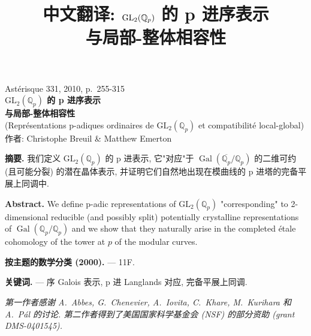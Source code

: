 \documentclass[11pt,a4paper,twoside]{ctexart}
\title{\bfseries 中文翻译: $\GL_2(\Qp)$ 的 p 进序表示\\ 与局部-整体相容性}
\author{}
\date{}
\theoremstyle{definition}
\theoremstyle{remark}
\newcommand{\Qp}{\mathbb{Q}_p}
\newcommand{\Gal}{\operatorname{Gal}}
\newcommand{\GL}{\mathrm{GL}}
\begin{document}
\begin{titlepage}
\thispagestyle{empty}
\begin{center}
{\small Ast\'erisque 331, 2010, p.\ 255-315}\\[1.5em]
{\LARGE\bfseries $\GL_2(\Qp)$ 的 p 进序表示\\[0.4em] 与局部-整体相容性}\\[0.8em]
{\normalsize (Repr\'esentations p-adiques ordinaires de $\GL_2(\Qp)$ et compatibilit\'e local-global)}\\[1.2em]
{\large 作者: Christophe Breuil \& Matthew Emerton}
\end{center}

\vspace{1.2em}

\noindent\textbf{摘要.} \quad 我们定义 $\GL_2(\Qp)$ 的 p 进表示, 它"对应"于 $\Gal(\overline{\Qp}/\Qp)$ 的二维可约 (且可能分裂) 的潜在晶体表示, 并证明它们自然地出现在模曲线的 p 进塔的完备平展上同调中.

\vspace{0.8em}

\noindent\textbf{Abstract.} \quad We define p-adic representations of $\GL_2(\Qp)$ "corresponding" to 2-dimensional reducible (and possibly split) potentially crystalline representations of $\Gal(\Qp/\Qp)$ and we show that they naturally arise in the completed \'etale cohomology of the tower at $p$ of the modular curves.

\vspace{0.8em}

\noindent\textbf{按主题的数学分类 (2000).} --- 11F.

\noindent\textbf{关键词.} --- 序 Galois 表示, p 进 Langlands 对应, 完备平展上同调.

\vspace{0.8em}

\noindent\textit{第一作者感谢 A.\ Abbes, G.\ Chenevier, A.\ Iovita, C.\ Khare, M.\ Kurihara 和 A.\ P\'al 的讨论. 第二作者得到了美国国家科学基金会 (NSF) 的部分资助 (grant DMS-0401545).}
\end{titlepage}

\tableofcontents
\newpage











\end{document}
